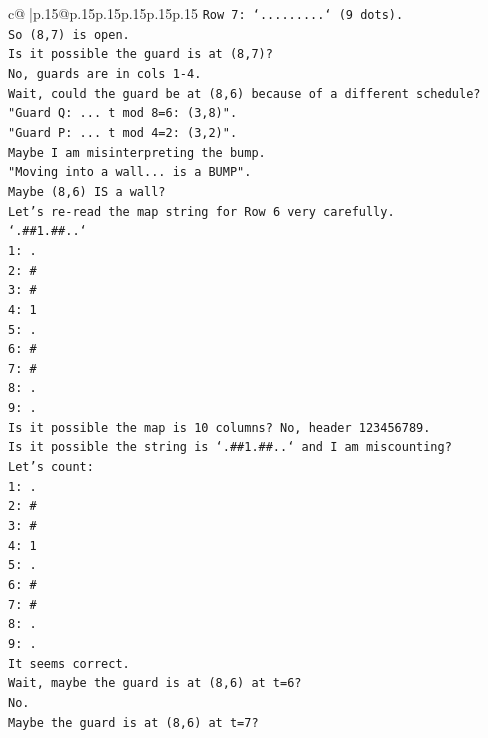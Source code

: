 \documentclass{article}
\begin{document}
{\begin{supertabular}{c@{$\;$}|p{.15\linewidth}@{}p{.15\linewidth}p{.15\linewidth}p{.15\linewidth}p{.15\linewidth}p{.15\linewidth}}
{{{\texttt{Row 7: `.........` (9 dots).} \\
\texttt{So (8,7) is open.} \\
\texttt{Is it possible the guard is at (8,7)?} \\
\texttt{No, guards are in cols 1{-}4.} \\
\texttt{Wait, could the guard be at (8,6) because of a different schedule?} \\
\texttt{"Guard Q: ... t mod 8=6: (3,8)".} \\
\texttt{"Guard P: ... t mod 4=2: (3,2)".} \\
\texttt{Maybe I am misinterpreting the bump.} \\
\texttt{"Moving into a wall... is a BUMP".} \\
\texttt{Maybe (8,6) IS a wall?} \\
\texttt{Let's re{-}read the map string for Row 6 very carefully.} \\
\texttt{`.\#\#1.\#\#..`} \\
\texttt{1: .} \\
\texttt{2: \#} \\
\texttt{3: \#} \\
\texttt{4: 1} \\
\texttt{5: .} \\
\texttt{6: \#} \\
\texttt{7: \#} \\
\texttt{8: .} \\
\texttt{9: .} \\
\texttt{Is it possible the map is 10 columns? No, header 123456789.} \\
\texttt{Is it possible the string is `.\#\#1.\#\#..` and I am miscounting?} \\
\texttt{Let's count:} \\
\texttt{1: .} \\
\texttt{2: \#} \\
\texttt{3: \#} \\
\texttt{4: 1} \\
\texttt{5: .} \\
\texttt{6: \#} \\
\texttt{7: \#} \\
\texttt{8: .} \\
\texttt{9: .} \\
\texttt{It seems correct.} \\
\texttt{Wait, maybe the guard is at (8,6) at t=6?} \\
\texttt{No.} \\
\texttt{Maybe the guard is at (8,6) at t=7?} \\
}}}
\end{supertabular}}
\end{document}
